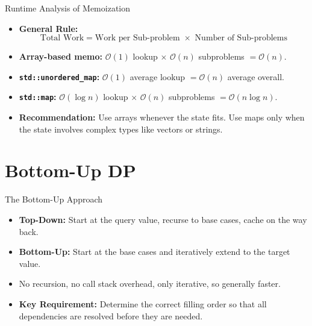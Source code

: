 \documentclass{beamer}
\begin{document}


\begin{frame}{Runtime Analysis of Memoization}
    \begin{itemize}
        \item \textbf{General Rule:}
        $$\text{Total Work} = \text{Work per Sub-problem } \times \text{ Number of Sub-problems}$$
        \item \textbf{Array-based memo:} $\mathcal{O}(1)$ lookup $\times$ $\mathcal{O}(n)$ subproblems $= \mathcal{O}(n)$.
        \item \textbf{\texttt{std::unordered\_map}:} $\mathcal{O}(1)$ average lookup $= \mathcal{O}(n)$ average overall.
        \item \textbf{\texttt{std::map}:} $\mathcal{O}(\log n)$ lookup $\times$ $\mathcal{O}(n)$ subproblems $= \mathcal{O}(n \log n)$.
        \item \textbf{Recommendation:} Use arrays whenever the state fits. Use maps only when the state involves complex types like vectors or strings.
    \end{itemize}
\end{frame}

\section{Bottom-Up DP}

\begin{frame}{The Bottom-Up Approach}
    \begin{itemize}
        \item \textbf{Top-Down:} Start at the query value, recurse to base cases, cache on the way back.
        \item \textbf{Bottom-Up:} Start at the base cases and iteratively extend to the target value.
        \item No recursion, no call stack overhead, only iterative, so generally faster.
        \item \textbf{Key Requirement:} Determine the correct filling order so that all dependencies are resolved before they are needed.
    \end{itemize}
\end{frame}
\end{document}

